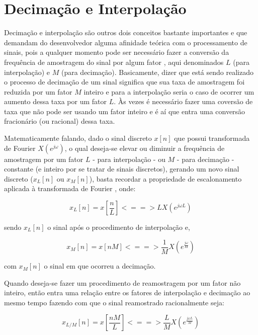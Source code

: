 \documentclass[
  12pt,				%
  openright,			%
  twoside,			%
  a4paper,			%
  english,			%
  french,				%
  spanish,			%
  brazil,				%
  ]{abntex2}
\begin{document}
\newpage
\section*{Decimação e Interpolação}

Decimação e interpolação são outros dois conceitos bastante importantes e que demandam do desenvolvedor alguma afinidade teórica com o processamento de sinais, pois a qualquer momento pode ser
necessário fazer a conversão da frequência de amostragem do sinal por algum fator \cite{hayes:1999}, aqui denominados $L$ (para interpolação) e $M$ (para decimação). Basicamente, dizer que está sendo realizado o processo
de decimação de um sinal significa que sua taxa de amostragem foi reduzida por um fator $M$ inteiro e para a interpolação seria o caso de ocorrer um aumento dessa taxa por um fator $L$.
Às vezes é necessário fazer uma coversão de taxa que não pode ser usando um fator inteiro e é aí que entra uma conversão fracionário (ou racional) dessa taxa.

Matematicamente falando, dado o sinal discreto $x[n]$ que possui transformada de Fourier $X(e^{j\omega})$, o qual deseja-se elevar ou diminuir a frequência de amostragem por um fator $L$
- para interpolação - ou $M$ - para decimação - constante (e inteiro por se tratar de sinais discretos), gerando um novo sinal discreto ($x_L[n]$ ou $x_M[n]$), basta recordar a propriedade de
escalonamento aplicada à transformada de Fourier \cite{Lathi:1998}, onde:

\begin{equation*}
  x_L[n] = x[\frac{n}{L}] <==> L X(e^{j\omega L})
\end{equation*}

sendo $x_L[n]$ o sinal após o procedimento de interpolação e,

\begin{equation*}
  x_M[n] = x[nM] <==> \frac{1}{M} X(e^{\frac{j\omega}{M}})
\end{equation*}

com $x_M[n]$ o sinal em que ocorreu a decimação.

Quando deseja-se fazer um procedimento de reamostragem por um fator não inteiro, então entra uma relação entre os fatores de interpolação e decimação ao mesmo tempo fazendo com que o sinal
reamostrado racionalmente seja:

\begin{equation*}
  x_{L/M}[n] = x[\frac{nM}{L}] <==> \frac{L}{M} X(e^{\frac{j\omega L}{M}})
\end{equation*}
\end{document}
